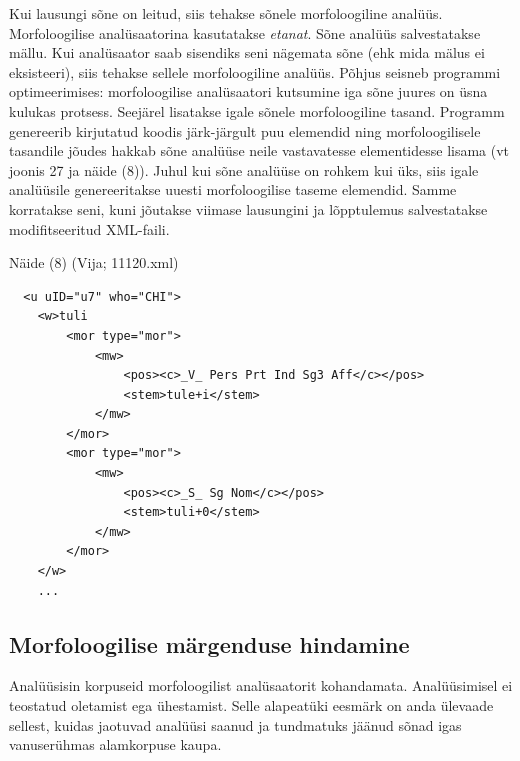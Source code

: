\documentclass[12pt]{article}
\begin{document}
Kui lausungi sõne on leitud, siis tehakse sõnele morfoloogiline analüüs. Morfoloogilise analüsaatorina kasutatakse \emph{etanat}. Sõne analüüs salvestatakse mällu. Kui analüsaator saab sisendiks seni nägemata sõne (ehk mida mälus ei eksisteeri), siis tehakse sellele morfoloogiline analüüs. Põhjus seisneb programmi optimeerimises: morfoloogilise analüsaatori kutsumine iga sõne juures on üsna kulukas protsess. Seejärel lisatakse igale sõnele morfoloogiline tasand. Programm genereerib kirjutatud koodis järk-järgult puu elemendid ning morfoloogilisele tasandile jõudes hakkab sõne analüüse neile vastavatesse elementidesse lisama (vt joonis 27 ja näide (8)). Juhul kui sõne analüüse on rohkem kui üks, siis igale analüüsile genereeritakse uuesti morfoloogilise taseme elemendid. Samme korratakse seni, kuni jõutakse viimase lausungini ja lõpptulemus salvestatakse modifitseeritud XML-faili.

Näide (8) (Vija; 11120.xml)
\begin{lstlisting}
  <u uID="u7" who="CHI">
    <w>tuli
        <mor type="mor">
            <mw>
                <pos><c>_V_ Pers Prt Ind Sg3 Aff</c></pos>
                <stem>tule+i</stem>
            </mw>
        </mor>
        <mor type="mor">
            <mw>
                <pos><c>_S_ Sg Nom</c></pos>
                <stem>tuli+0</stem>
            </mw>
        </mor>
    </w>
    ...
\end{lstlisting}

\subsection{Morfoloogilise märgenduse hindamine}

Analüüsisin korpuseid morfoloogilist analüsaatorit kohandamata. Analüüsimisel ei teostatud oletamist ega ühestamist. Selle alapeatüki eesmärk on anda ülevaade sellest, kuidas jaotuvad analüüsi saanud ja tundmatuks jäänud sõnad igas vanuserühmas alamkorpuse kaupa.
\end{document}
